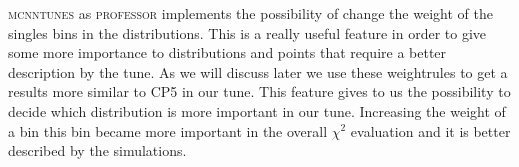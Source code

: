 \textsc{mcnntunes} as \textsc{professor} implements the possibility of change the weight of the singles bins in the distributions. This is a really useful feature in order to give some more importance to distributions and points that require a better description by the tune. As we will discuss later we use these weightrules to get a results more similar to CP5 in our tune. 
This feature gives to us the possibility to decide which distribution is more important in our tune.
Increasing the weight of a bin this bin became more important in the overall $\chi^2$ evaluation and it is better described by the simulations. 
%


